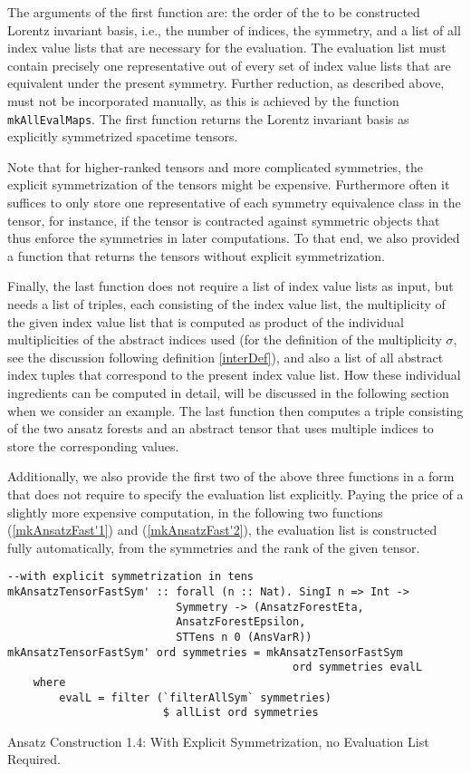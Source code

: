 The arguments of the first function are: the order of the to be constructed Lorentz invariant basis, i.e., the number of indices, the symmetry, and a list of all index value lists that are necessary for the evaluation. The evaluation list must contain precisely one representative out of every set of index value lists that are equivalent under the present symmetry. Further reduction, as described above, must not be incorporated manually, as this is achieved by the function \texttt{mkAllEvalMaps}.
The first function returns the Lorentz invariant basis as explicitly symmetrized spacetime tensors.

Note that for higher-ranked tensors and more complicated symmetries, the explicit symmetrization of the tensors might be expensive. Furthermore often it suffices to only store one representative of each symmetry equivalence class in the tensor, for instance, if the tensor is contracted against symmetric objects that thus enforce the symmetries in later computations. To that end, we also provided a function that returns the tensors without explicit symmetrization.

Finally, the last function does not require a list of index value lists as input, but needs a list of triples, each consisting of the index value list, the multiplicity of the given index value list that is computed as product of the individual multiplicities of the abstract indices used (for the definition of the multiplicity $\sigma$, see the discussion following definition \ref{interDef}), and also a list of all abstract index tuples that correspond to the present index value list. How these individual ingredients can be computed in detail, will be discussed in the following section when we consider an example. The last function then computes a triple consisting of the two ansatz forests and an abstract tensor that uses multiple indices to store the corresponding values. 

Additionally, we also provide the first two of the above three functions in a form that does not require to specify the evaluation list explicitly. Paying the price of a slightly more expensive computation, in the following two functions (\ref{mkAnsatzFast'1}) and (\ref{mkAnsatzFast'2}), the evaluation list is constructed fully automatically, from the symmetries and the rank of the given tensor.

\begin{listing}[hbt!]
\begin{verbatim}
--with explicit symmetrization in tens
mkAnsatzTensorFastSym' :: forall (n :: Nat). SingI n => Int ->
                          Symmetry -> (AnsatzForestEta,
                          AnsatzForestEpsilon,
                          STTens n 0 (AnsVarR))
mkAnsatzTensorFastSym' ord symmetries = mkAnsatzTensorFastSym
                                            ord symmetries evalL
    where
        evalL = filter (`filterAllSym` symmetries) 
                        $ allList ord symmetries
\end{verbatim} 
\caption{Ansatz Construction 1.4: With Explicit Symmetrization, no Evaluation List Required.}\label{mkAnsatzFast'1}
\end{listing}

